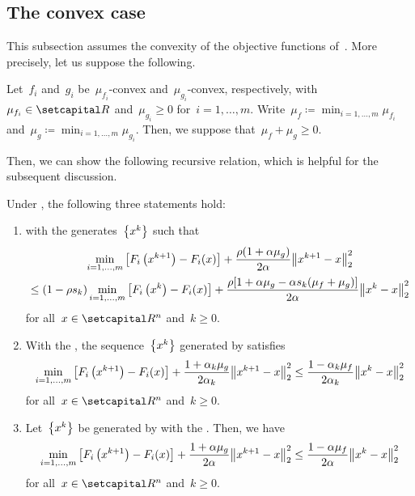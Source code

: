 \documentclass[../../main]{subfiles}
\begin{document}
\subsection{The convex case}
This subsection assumes the convexity of the objective functions of~.
More precisely, let us suppose the following.
\begin{assumption} 
    Let~$f_i$ and~$g_i$ be~$\mu_{f_i}$-convex and~$\mu_{g_i}$-convex, respectively, with~$\mu_{f_i} \in \setR$ and~$\mu_{g_i} \ge 0$ for~$i = 1, \dots, m$.
    Write~$\mu_f \coloneqq \min_{i = 1, \dots, m} \mu_{f_i}$ and~$\mu_g \coloneqq \min_{i = 1, \dots, m} \mu_{g_i}$.
    Then, we suppose that~$\mu_f + \mu_g \ge 0$.
\end{assumption}

Then, we can show the following recursive relation, which is helpful for the subsequent discussion.
\begin{lemma} 
    Under , the following three statements hold:
    \begin{enumerate} 
        \item {} with the  generates~$\set*{x^k}$ such that
            \begin{multline}
                \min_{i = 1, \dots, m} \left[F_i\left(x^{k + 1}\right) - F_i(x)\right] + \frac{\rho (1 + \alpha \mu_g)}{2 \alpha} \norm*{x^{k + 1} - x}_2^2 \\
                \le (1 - \rho s_k) \min_{i = 1, \dots, m} \left[F_i\left(x^k\right) - F_i(x)\right] + \frac{\rho [1 + \alpha \mu_g - \alpha s_k (\mu_f + \mu_g)]}{2 \alpha} \norm*{x^k - x}_2^2
            \end{multline}
            for all~$x \in \setR^n$ and~$k \ge 0$. 
        \item With the , the sequence~$\set*{x^k}$ generated by  satisfies 
            \begin{equation}
                \min_{i = 1, \dots, m} \left[F_i\left(x^{k + 1}\right) - F_i(x)\right] + \frac{1 + \alpha_k \mu_g}{2 \alpha_k} \norm*{x^{k + 1} - x}_2^2 \le \frac{1 - \alpha_k \mu_f}{2 \alpha_k} \norm*{x^k - x}_2^2
            \end{equation}
            for all~$x \in \setR^n$ and~$k \ge 0$. 
        \item Let~$\set*{x^k}$ be generated by  with the .
            Then, we have
            \begin{equation}
                \min_{i = 1, \dots, m} \left[F_i\left(x^{k + 1}\right) - F_i(x)\right] + \frac{1 + \alpha \mu_g}{2 \alpha} \norm*{x^{k + 1} - x}_2^2 \le \frac{1 - \alpha \mu_f}{2 \alpha} \norm*{x^k - x}_2^2
            \end{equation}
            for all~$x \in \setR^n$ and~$k \ge 0$. 
    \end{enumerate}
\end{lemma}
\end{document}
